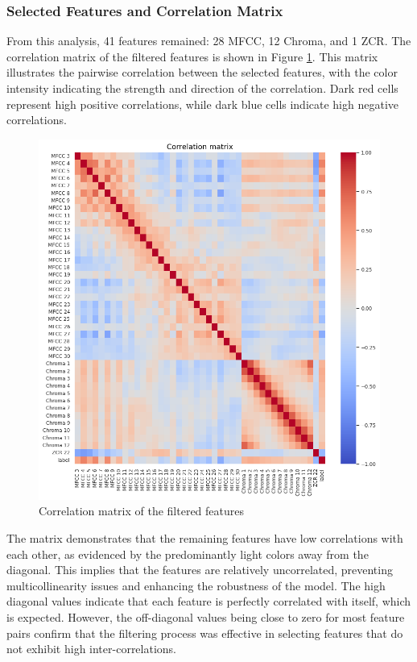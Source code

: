 \subsubsection*{Selected Features and Correlation Matrix}

From this analysis, 41 features remained: 28 MFCC, 12 Chroma, and 1 ZCR.
The correlation matrix of the filtered features is shown in Figure \ref{fig:correlation_matrix}.
This matrix illustrates the pairwise correlation between the selected features, with the color intensity
indicating the strength and direction of the correlation. Dark red cells represent high positive correlations,
while dark blue cells indicate high negative correlations.

\begin{figure}[H]
    \centering
    \includegraphics[width=0.9\columnwidth]{../images/correlation_matrix.png}
    \caption{Correlation matrix of the filtered features}
    \label{fig:correlation_matrix}
\end{figure}
\noindent
The matrix demonstrates that the remaining features have low correlations with each other, as evidenced by the predominantly
light colors away from the diagonal. This implies that the features are relatively uncorrelated, preventing multicollinearity
issues and enhancing the robustness of the model. The high diagonal values indicate that each feature is perfectly correlated
with itself, which is expected. However, the off-diagonal values being close to zero for most feature pairs confirm that the filtering
process was effective in selecting features that do not exhibit high inter-correlations.


